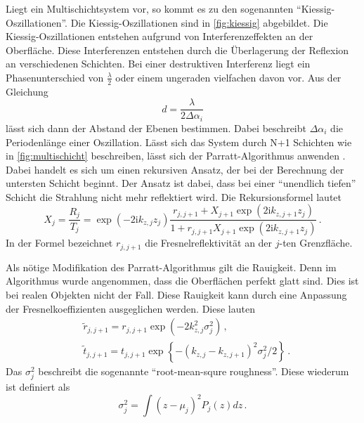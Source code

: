 Liegt ein Multischichtsystem vor, so kommt es zu den sogenannten \enquote{Kiessig-Oszillationen}.
Die Kiessig-Oszillationen sind in \autoref{fig:kiessig} abgebildet.
Die Kiessig-Oszillationen entstehen aufgrund von Interferenzeffekten an der Oberfläche.
Diese Interferenzen entstehen durch die Überlagerung der Reflexion an verschiedenen Schichten.
Bei einer destruktiven Interferenz liegt ein Phasenunterschied von $\frac{\lambda}{2}$ oder einem ungeraden vielfachen davon vor.
Aus der Gleichung
\begin{equation} \label{eq:schichtdicke}
    d = \frac{\lambda}{2 \Delta \alpha_i}
\end{equation}
lässt sich dann der Abstand der Ebenen bestimmen.
Dabei beschreibt $\Delta \alpha_i$ die Periodenlänge einer Oszillation. 
Lässt sich das System durch N+1 Schichten wie in \autoref{fig:multischicht} beschreiben, lässt sich der Parratt-Algorithmus anwenden \cite{tolan_xray}.
Dabei handelt es sich um einen rekursiven Ansatz, der bei der Berechnung der untersten Schicht beginnt.
Der Ansatz ist dabei, dass bei einer \enquote{unendlich tiefen} Schicht die Strahlung nicht mehr reflektiert wird.
Die Rekursionsformel lautet
\begin{equation}
    X_j=\frac{R_j}{T_j}=\exp \left(-2 \mathrm{i} k_{z, j} z_j\right) \frac{r_{j, j+1}+X_{j+1} \exp \left(2 \mathrm{i} k_{z, j+1} z_j\right)}{1+r_{j, j+1} X_{j+1} \exp \left(2 \mathrm{i} k_{z, j+1} z_j\right)} \, .
\end{equation}
In der Formel bezeichnet $r_{j,j+1}$ die Fresnelreflektivität an der $j$-ten Grenzfläche.

Als nötige Modifikation des Parratt-Algorithmus gilt die Rauigkeit.
Denn im Algorithmus wurde angenommen, dass die Oberflächen perfekt glatt sind.
Dies ist bei realen Objekten nicht der Fall.
Diese Rauigkeit kann durch eine Anpassung der Fresnelkoeffizienten ausgeglichen werden.
Diese lauten
\begin{align}
    & \tilde{r}_{j, j+1}=r_{j, j+1} \exp \left(-2 k_{z, j}^2 \sigma_j^2\right) \, ,\\
    & \tilde{t}_{j, j+1}=t_{j, j+1} \exp \left\{-\left(k_{z, j}-k_{z, j+1}\right)^2 \sigma_j^2 / 2\right\} \, .
\end{align}
Das $\sigma_j^2$ beschreibt die sogenannte \enquote{root-mean-squre roughness}.
Diese wiederum ist definiert als
\begin{equation*}
    \sigma_j^2 = \int (z - \mu_j)^2 P_j (z) dz \, .
\end{equation*}


